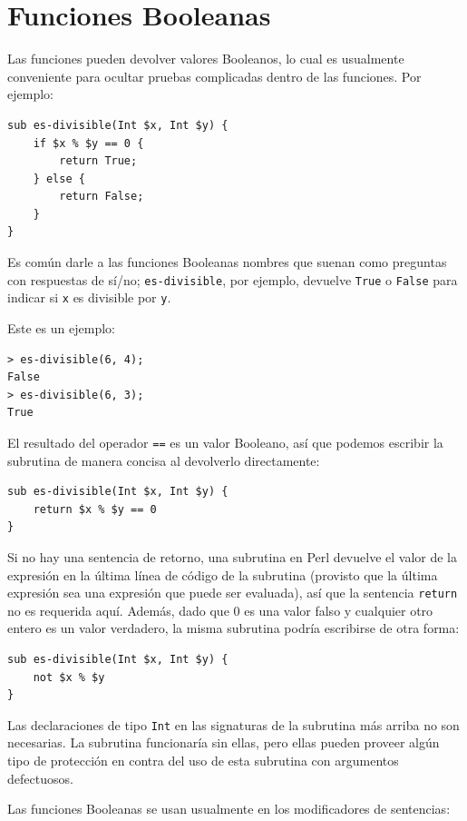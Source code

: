 \section{Funciones Booleanas}
\label{boolean}

Las funciones pueden devolver valores Booleanos, lo cual es usualmente
conveniente para ocultar pruebas complicadas dentro de las funciones. Por
ejemplo:

\begin{lstlisting}
sub es-divisible(Int $x, Int $y) {
    if $x % $y == 0 {
        return True;
    } else {
        return False;
    }
}
\end{lstlisting}
%
Es común darle a las funciones Booleanas nombres que suenan como
preguntas con respuestas de sí/no; \verb|es-divisible|, por ejemplo,
devuelve {\tt True} o {\tt False} para indicar si {\tt x} es divisible
por {\tt y}.

Este es un ejemplo:

\begin{lstlisting}
> es-divisible(6, 4);
False
> es-divisible(6, 3);
True
\end{lstlisting}
%
El resultado del operador {\tt ==} es un valor Booleano,
así que podemos escribir la subrutina de manera concisa al 
devolverlo directamente:

\begin{lstlisting}
sub es-divisible(Int $x, Int $y) {
    return $x % $y == 0
}
\end{lstlisting}
%
Si no hay una sentencia de retorno, una subrutina en Perl devuelve
el valor de la expresión en la última línea de código de la 
subrutina (provisto que la última expresión sea una expresión
que puede ser evaluada), así que la sentencia {\tt return} no 
es requerida aquí. Además, dado que 0 es una valor falso y cualquier 
otro entero es un valor verdadero, la misma subrutina podría escribirse
de otra forma:

\begin{lstlisting}
sub es-divisible(Int $x, Int $y) { 
    not $x % $y 
}
\end{lstlisting}

Las declaraciones de tipo {\tt Int} en las signaturas de la subrutina
más arriba no son necesarias. La subrutina funcionaría sin ellas, pero
ellas pueden proveer algún tipo de protección en contra del uso 
de esta subrutina con argumentos defectuosos.

Las funciones Booleanas se usan usualmente en los 
modificadores de sentencias:

